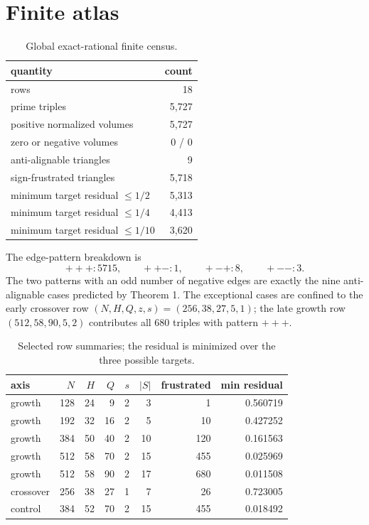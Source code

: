 \documentclass[10pt]{article}
\begin{document}
\section{Finite atlas}

\begin{table}[ht]
\centering
\small
\caption{Global exact-rational finite census.}
\label{tab:global}
\begin{tabular}{@{}lr@{}}
\toprule
quantity & count\\
\midrule
rows & 18\\
prime triples & 5,727\\
positive normalized volumes & 5,727\\
zero or negative volumes & 0 / 0\\
anti-alignable triangles & 9\\
sign-frustrated triangles & 5,718\\
minimum target residual $\leq 1/2$ & 5,313\\
minimum target residual $\leq 1/4$ & 4,413\\
minimum target residual $\leq 1/10$ & 3,620\\
\bottomrule
\end{tabular}
\end{table}

The edge-pattern breakdown is
\[
 +++:5715,\qquad ++-:1,\qquad +-+:8,\qquad +--:3.
\]
The two patterns with an odd number of negative edges are exactly the nine
anti-alignable cases predicted by Theorem 1.  The exceptional cases are
confined to the early crossover row $(N,H,Q,z,s)=(256,38,27,5,1)$; the late
growth row $(512,58,90,5,2)$ contributes all 680 triples with pattern $+++ $.

\begin{table}[ht]
\centering
\scriptsize
\caption{Selected row summaries; the residual is minimized over the three
possible targets.}
\label{tab:rows}
\begin{tabular}{@{}lrrrrrrr@{}}
\toprule
axis & $N$ & $H$ & $Q$ & $s$ & $|S|$ & frustrated & min residual\\
\midrule
growth &128&24&9 &2&3 &1 &0.560719\\
growth &192&32&16&2&5 &10&0.427252\\
growth &384&50&40&2&10&120&0.161563\\
growth &512&58&70&2&15&455&0.025969\\
growth &512&58&90&2&17&680&0.011508\\
crossover&256&38&27&1&7&26&0.723005\\
control&384&52&70&2&15&455&0.018492\\
\bottomrule
\end{tabular}
\end{table}
\end{document}
